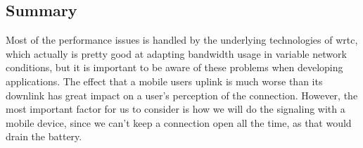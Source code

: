 \subsection{Summary}
Most of the performance issues is handled by the underlying technologies of \gls{wrtc}, which actually is pretty good at adapting bandwidth usage in variable network conditions, but it is important to be aware of these problems when developing applications. The effect that a mobile users uplink is much worse than its downlink has great impact on a user's perception of the connection. However, the most important factor for us to consider is how we will do the signaling with a mobile device, since we can't keep a connection open all the time, as that would drain the battery.